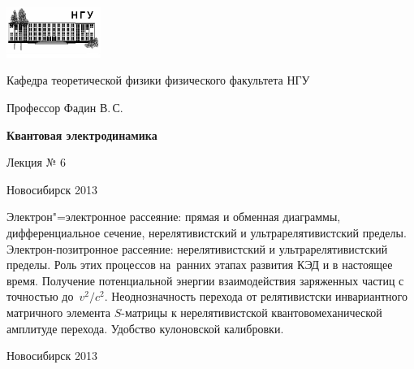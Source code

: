 \documentclass[12pt,pagesize,paper=192mm:108mm]{scrbook}
\begin{document}
\begin{titlepage}
  \vspace*{-1em}
  \begin{center}
    \includegraphics[width=0.23\textwidth]{../NSU-logo}

    Кафедра теоретической физики физического факультета НГУ
    \medskip

    \Large
    Профессор Фадин В.\,С.
    \bigskip

    \huge
    \textbf{Квантовая электродинамика}
    \bigskip

    \Large
    Лекция № 6
    \vfill

    \normalsize
    \vfill

    \normalsize \ccbysa\hspace{0.5em}  Новосибирск 2013
  \end{center}
\end{titlepage}
\vspace*{-1em}
\begin{center}
\vfill
  \begin{minipage}{0.65\linewidth}
    Электрон"=электронное рассеяние: прямая и обменная диаграммы,
    дифференциальное сечение, нерелятивистский и ультрарелятивистский
    пределы. Электрон-позитронное рассеяние: нерелятивистский и
    ультрарелятивистский пределы. Роль этих процессов на~ранних этапах
    развития КЭД и в настоящее время. Получение потенциальной энергии
    взаимодействия заряженных частиц с точностью
    до~$v^2/c^2$. Неоднозначность перехода от релятивистски
    инвариантного матричного элемента $S$-матрицы к нерелятивистской
    квантовомеханической амплитуде перехода. Удобство кулоновской
    калибровки.
  \end{minipage}
  \vfill

  \normalsize \ccbysa\hspace{0.5em} Новосибирск 2013
\end{center}
\end{document}
